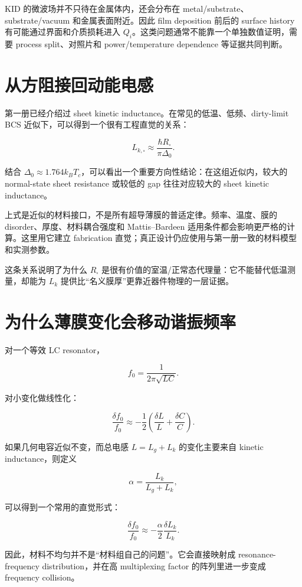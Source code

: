 KID 的微波场并不只待在金属体内，还会分布在 metal/substrate、substrate/vacuum 和金属表面附近。因此 film deposition 前后的 surface history 有可能通过界面和介质损耗进入 $Q_i$。这类问题通常不能靠一个单独数值证明，需要 process split、对照片和 power/temperature dependence 等证据共同判断。

\section{从方阻接回动能电感}

第一册已经介绍过 sheet kinetic inductance。在常见的低温、低频、dirty-limit BCS 近似下，可以得到一个很有工程直觉的关系：

\[
L_{k,\square} \approx \frac{\hbar R_\square}{\pi\Delta_0}.
\]

结合 $\Delta_0\approx1.764k_BT_c$，可以看出一个重要方向性结论：在这组近似内，较大的 normal-state sheet resistance 或较低的 gap 往往对应较大的 sheet kinetic inductance。

\begin{warningbox}
上式是近似的材料接口，不是所有超导薄膜的普适定律。频率、温度、膜的 disorder、厚度、材料耦合强度和 Mattis--Bardeen 适用条件都会影响更严格的计算。这里用它建立 fabrication 直觉；真正设计仍应使用与第一册一致的材料模型和实测参数。
\end{warningbox}

这条关系说明了为什么 $R_\square$ 是很有价值的室温/正常态代理量：它不能替代低温测量，却能为 $L_k$ 提供比“名义膜厚”更靠近器件物理的一层证据。

\section{为什么薄膜变化会移动谐振频率}

对一个等效 LC resonator，

\[
f_0=\frac{1}{2\pi\sqrt{LC}}.
\]

对小变化做线性化：

\[
\frac{\delta f_0}{f_0}
\approx
-\frac{1}{2}\left(\frac{\delta L}{L}+\frac{\delta C}{C}\right).
\]

如果几何电容近似不变，而总电感 $L=L_g+L_k$ 的变化主要来自 kinetic inductance，则定义

\[
\alpha=\frac{L_k}{L_g+L_k},
\]

可以得到一个常用的直觉形式：

\[
\frac{\delta f_0}{f_0}
\approx
-\frac{\alpha}{2}\frac{\delta L_k}{L_k}.
\]

因此，材料不均匀并不是“材料组自己的问题”。它会直接映射成 resonance-frequency distribution，并在高 multiplexing factor 的阵列里进一步变成 frequency collision。

